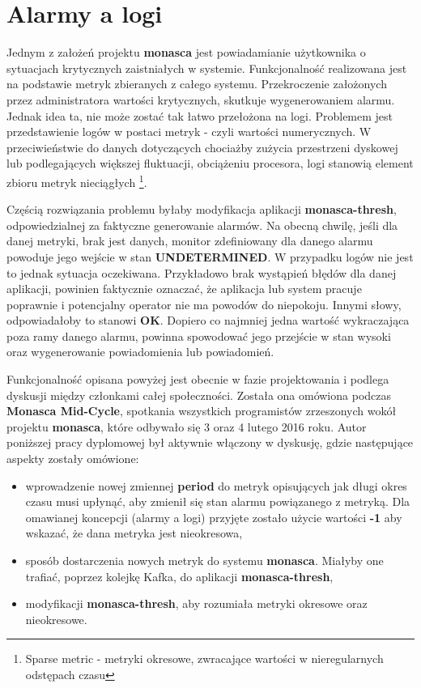 \section{Alarmy a logi}
\label{chapter:application_own:plans:alarm_on_logs}

Jednym z założeń projektu \textbf{monasca} jest powiadamianie użytkownika o 
sytuacjach krytycznych zaistniałych w systemie. Funkcjonalność realizowana jest na podstawie
metryk zbieranych z całego systemu. Przekroczenie założonych przez administratora wartości
krytycznych, skutkuje wygenerowaniem alarmu. Jednak idea ta, nie może zostać
tak łatwo przełożona na logi. Problemem jest przedstawienie logów w postaci metryk - czyli wartości
numerycznych. W przeciwieństwie do danych dotyczących chociażby zużycia przestrzeni dyskowej lub podlegających większej
fluktuacji, obciążeniu procesora, logi stanowią element zbioru metryk nieciągłych \footnote{Sparse metric - metryki okresowe,
zwracające wartości w nieregularnych odstępach czasu}. 

Częścią rozwiązania problemu byłaby modyfikacja aplikacji \textbf{monasca-thresh}, odpowiedzialnej za faktyczne generowanie 
alarmów. Na obecną chwilę, jeśli dla danej metryki, brak jest danych, monitor zdefiniowany dla danego alarmu powoduje jego 
wejście w stan \textbf{UNDETERMINED}. W przypadku logów nie jest to jednak sytuacja oczekiwana. Przykładowo brak wystąpień 
błędów dla danej aplikacji, powinien faktycznie oznaczać, że aplikacja lub system pracuje poprawnie i potencjalny operator nie 
ma powodów do niepokoju. Innymi słowy, odpowiadałoby to stanowi \textbf{OK}. Dopiero co najmniej jedna wartość wykraczająca 
poza ramy danego alarmu, powinna spowodować jego przejście w stan wysoki oraz wygenerowanie powiadomienia lub powiadomień.

Funkcjonalność opisana powyżej jest obecnie w fazie projektowania i podlega dyskusji między członkami całej społeczności.
Została ona omówiona podczas \textbf{Monasca Mid-Cycle}, spotkania wszystkich programistów zrzeszonych wokół projektu
\textbf{monasca}, które odbywało się 3 oraz 4 lutego 2016 roku. Autor poniższej pracy dyplomowej był aktywnie włączony
w dyskusję, gdzie następujące aspekty zostały omówione:
\begin{itemize}
    \item wprowadzenie nowej zmiennej \textbf{period} do metryk opisujących jak długi okres czasu musi upłynąć, aby
    zmienił się stan alarmu powiązanego z metryką. Dla omawianej koncepcji (alarmy a logi) przyjęte zostało użycie wartości
    \textbf{-1} aby wskazać, że dana metryka jest nieokresowa,
    \item sposób dostarczenia nowych metryk do systemu \textbf{monasca}. Miałyby one trafiać, poprzez kolejkę Kafka,
    do aplikacji \textbf{monasca-thresh},
    \item modyfikacji \textbf{monasca-thresh}, aby rozumiała metryki okresowe oraz nieokresowe.
\end{itemize}